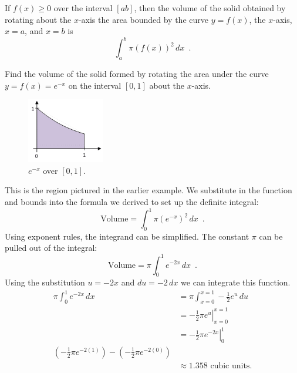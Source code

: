 \begin{theorem}[Volume]
If $f(x)\geq 0$ over the interval $[a b]$, then the volume of the solid obtained by rotating about the $x$-axis the area bounded by the curve $y=f(x)$, the $x$-axis, $x=a$, and $x=b$ is
$$\int_a^b \pi(f(x))^2\,dx \enspace .$$
\end{theorem}
\begin{example}
Find the volume of the solid formed by rotating the area under the curve $y=f(x)=e^{-x}$ on the interval $[0,1]$ about the $x$-axis.

\begin{figure}[!ht]
  \centering
    \includegraphics[width=0.3\textwidth]{img/chap5/image073.png}
    \caption{$e^{-x}$ over $[0,1]$.}
    \label{fig:5-8-enegx}
\end{figure}

\begin{solution}
This is the region pictured in the earlier example. We substitute in the function and bounds into the formula we derived to set up the definite integral:
$$\text{Volume} = \int_0^1 \pi (e^{-x})^2\,dx \enspace .$$
Using exponent rules, the integrand can be simplified. The constant $\pi$ can be pulled out of the integral:
$$\text{Volume} = \pi\int_0^1e^{-2x}\,dx \enspace .$$
Using the substitution $u=-2x$ and $du = -2\,dx$ we can integrate this function.
\begin{align*}
\pi \int_0^1 e^{-2x}\,dx &= \pi\int_{x=0}^{x=1}-\frac{1}{2}e^u\,du\\
  &= \left.-\frac{1}{2}\pi e^u\right|_{x=0}^{x=1} \\
  &= \left.-\frac{1}{2}\pi e^{-2x}\right|_0^1\\
    \left(-\frac{1}{2}\pi e^{-2(1)}\right)-\left(-\frac{1}{2}\pi e^{-2(0)}\right) \\
  &\approx 1.358 \text{ cubic units}.
\end{align*}
\end{solution}\end{example}
